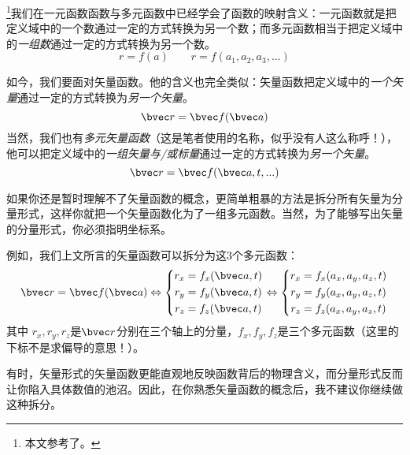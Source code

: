 
\footnote{本文参考了\cite{Thomas}。}我们在一元函数函数与多元函数中已经学会了函数的映射含义：一元函数就是把定义域中的一个数通过一定的方式转换为另一个数；而多元函数相当于把定义域中的\textsl{一组数}通过一定的方式转换为另一个数。
$$
r=f(a) \qquad r=f(a_1, a_2, a_3,...)
$$

如今，我们要面对矢量函数。他的含义也完全类似：矢量函数把定义域中的\textsl{一个矢量}通过一定的方式转换为\textsl{另一个矢量}。
$$
\bvec r = \bvec f (\bvec a)
$$
当然，我们也有\textsl{多元矢量函数}（这是笔者使用的名称，似乎没有人这么称呼！），他可以把定义域中的\textsl{一组矢量与/或标量}通过一定的方式转换为\textsl{另一个矢量}。
$$
\bvec r = \bvec f (\bvec a, t, ...)
$$

如果你还是暂时理解不了矢量函数的概念，更简单粗暴的方法是拆分所有矢量为分量形式，这样你就把一个矢量函数化为了一组多元函数。当然，为了能够写出矢量的分量形式，你必须指明坐标系。

例如，我们上文所言的矢量函数可以拆分为这$3$个多元函数：
$$
\bvec r = \bvec f (\bvec a)
\Leftrightarrow
\left \{
\begin{aligned}
r_x &= f_x(\bvec a, t)\\
r_y &= f_y(\bvec a, t)\\
r_z &= f_z(\bvec a, t)\\
\end{aligned}
\right.
\Leftrightarrow
\left \{
\begin{aligned}
r_x &= f_x(a_x,a_y,a_z,t)\\
r_y &= f_y(a_x,a_y,a_z,t)\\
r_z &= f_z(a_x,a_y,a_z,t)\\
\end{aligned}
\right.
$$
其中 $r_x, r_y, r_z$是$\bvec r$分别在三个轴上的分量，$f_x,f_y,f_z$是三个多元函数（这里的下标不是求偏导的意思！）。

有时，矢量形式的矢量函数更能直观地反映函数背后的物理含义，而分量形式反而让你陷入具体数值的池沼。因此，在你熟悉矢量函数的概念后，我不建议你继续做这种拆分。
